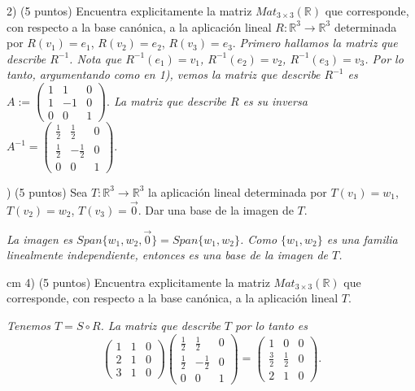 \documentclass[12pt,a4paper]{amsart}
\newcommand{\RR}{\mathbb{R}} %
\begin{document}
 
2) (5 puntos) Encuentra explicitamente la matriz  $Mat_{3\times 3}(\RR)$
que corresponde, con respecto a la base can\'onica, a la aplicaci\'on lineal
$R \colon \RR^3\to \RR^3$ determinada por $R(v_1)=e_1$, $R(v_2)=e_2$,
$R(v_3)=e_3$.
\vskip 0.5cm \emph{Primero hallamos la matriz que describe $R^{-1}$. Nota que 
$R^{-1}(e_1)=v_1$, $R^{-1}(e_2)=v_2$,
$R^{-1}(e_3)=v_3$. Por lo tanto, argumentando como en 1), vemos la matriz que describe $R^{-1}$ es $A:=\left(\begin{array}{ccc}1 & 1 & 0 \\1 & -1 & 0 \\0 & 0 & 1\end{array}\right).$ La matriz que
describe $R$ es su inversa $A^{-1}=\left(\begin{array}{ccc}\frac{1}{2} & \frac{1}{2} & 0 \\\frac{1}{2} & -\frac{1}{2} & 0 \\0 & 0 & 1\end{array}\right).$}

)  (5 puntos)  Sea
$T \colon \RR^3\to \RR^3$ la aplicaci\'on lineal determinada por $T(v_1)=w_1$, $T(v_2)=w_2$,
$T(v_3)=\vec{0}$. Dar una base de la imagen de $T$.

\vskip 0.5cm\emph{
La imagen es $Span\{w_1,w_2,\vec{0}\}=Span\{w_1,w_2\}$. Como $\{w_1,w_2\}$ es una familia linealmente independiente, entonces es una base de la imagen de $T$.
} 

 cm
4)  (5 puntos) Encuentra explicitamente la matriz  $Mat_{3\times 3}(\RR)$
que corresponde, con respecto a la base can\'onica, a la aplicaci\'on lineal
$T$.

\vskip 0.5cm
\emph{ Tenemos $T=S\circ R$. La matriz que describe $T$ por lo tanto es
$$\left(\begin{array}{ccc}1 & 1 & 0 \\2 & 1 & 0 \\3 & 1 & 0\end{array}\right)\left(\begin{array}{ccc}\frac{1}{2} & \frac{1}{2} & 0 \\\frac{1}{2} & -\frac{1}{2} & 0 \\0 & 0 & 1\end{array}\right)=
\left(\begin{array}{ccc}1 &0 & 0 \\\frac{3}{2} & \frac{1}{2} & 0 \\2& 1 & 0\end{array}\right)
.$$}
\end{document}
